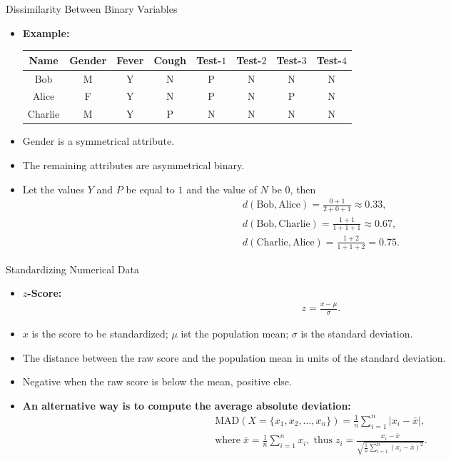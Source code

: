 \begin{frame}{Dissimilarity Between Binary Variables}
	\begin{itemize}
		\item \textbf{Example:}\;
		      \begin{tabular}{| c | c | c | c | c | c | c | c |}
			      \hline
			      Name    & Gender & Fever & Cough & Test-$1$ & Test-$2$ & Test-$3$ & Test-$4$ \\\hline
			      Bob     & M      & Y     & N     & P        & N        & N        & N        \\
			      Alice   & F      & Y     & N     & P        & N        & P        & N        \\
			      Charlie & M      & Y     & P     & N        & N        & N        & N        \\\hline
		      \end{tabular}
		\item Gender is a symmetrical attribute.
		\item The remaining attributes are asymmetrical binary.
		\item Let the values $Y$ and $P$ be equal to $1$ and the value of $N$ be $0$, then
		      \begin{align}
			      d(\text{Bob}, \text{Alice}) = \frac{0+1}{2+0+1} \approx 0.33,   \\
			      d(\text{Bob}, \text{Charlie}) = \frac{1+1}{1+1+1} \approx 0.67, \\
			      d(\text{Charlie}, \text{Alice}) = \frac{1+2}{1+1+2} = 0.75.
		      \end{align}
	\end{itemize}
\end{frame}

\begin{frame}{Standardizing Numerical Data}
	\begin{itemize}
		\item \textbf{$z$-Score:}
		      \begin{align}
			      z = \frac{x-\mu}{\sigma}.
		      \end{align}
		\item $x$ is the score to be standardized; $\mu$ ist the population mean; $\sigma$ is the standard deviation.
		\item The distance between the raw score and the population mean in units of the standard deviation.
		\item Negative when the raw score is below the mean, positive else.
		\item \textbf{An alternative way is to compute the average absolute deviation:}
		      \begin{align}
			      \text{MAD}(X = \{x_1,x_2,\ldots,x_n\}) = \frac{1}{n} \sum_{i=1}^{n} \vert x_i - \bar{x} \vert, \\
			      \text{where} \; \bar{x} = \frac{1}{n} \sum_{i=1}^{n}x_i, \; \text{thus} \; z_i = \frac{x_i-\bar{x}}{\sqrt{\frac{1}{n}\sum_{i=1}^{n}(x_i-\bar{x})^2}}.
		      \end{align}
	\end{itemize}
\end{frame}

